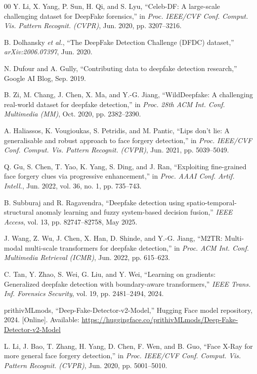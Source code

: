\documentclass[conference]{IEEEtran}
\begin{document}
\begin{thebibliography}{00}
 Y. Li, X. Yang, P. Sun, H. Qi, and S. Lyu, ``Celeb-DF: A large-scale challenging dataset for DeepFake forensics,'' in \textit{Proc. IEEE/CVF Conf. Comput. Vis. Pattern Recognit. (CVPR)}, Jun. 2020, pp. 3207--3216.

 B. Dolhansky \textit{et al.}, ``The DeepFake Detection Challenge (DFDC) dataset,'' \textit{arXiv:2006.07397}, Jun. 2020.

 N. Dufour and A. Gully, ``Contributing data to deepfake detection research,'' Google AI Blog, Sep. 2019.

 B. Zi, M. Chang, J. Chen, X. Ma, and Y.-G. Jiang, ``WildDeepfake: A challenging real-world dataset for deepfake detection,'' in \textit{Proc. 28th ACM Int. Conf. Multimedia (MM)}, Oct. 2020, pp. 2382--2390.

 A. Haliassos, K. Vougioukas, S. Petridis, and M. Pantic, ``Lips don't lie: A generalisable and robust approach to face forgery detection,'' in \textit{Proc. IEEE/CVF Conf. Comput. Vis. Pattern Recognit. (CVPR)}, Jun. 2021, pp. 5039--5049.

 Q. Gu, S. Chen, T. Yao, K. Yang, S. Ding, and J. Ran, ``Exploiting fine-grained face forgery clues via progressive enhancement,'' in \textit{Proc. AAAI Conf. Artif. Intell.}, Jun. 2022, vol. 36, no. 1, pp. 735--743.

 B. Subburaj and R. Ragavendra, ``Deepfake detection using spatio-temporal-structural anomaly learning and fuzzy system-based decision fusion,'' \textit{IEEE Access}, vol. 13, pp. 82747--82758, May 2025.

 J. Wang, Z. Wu, J. Chen, X. Han, D. Shinde, and Y.-G. Jiang, ``M2TR: Multi-modal multi-scale transformers for deepfake detection,'' in \textit{Proc. ACM Int. Conf. Multimedia Retrieval (ICMR)}, Jun. 2022, pp. 615--623.

 C. Tan, Y. Zhao, S. Wei, G. Liu, and Y. Wei, ``Learning on gradients: Generalized deepfake detection with boundary-aware transformers,'' \textit{IEEE Trans. Inf. Forensics Security}, vol. 19, pp. 2481--2494, 2024.

 prithivMLmods, ``Deep-Fake-Detector-v2-Model,'' Hugging Face model repository, 2024. [Online]. Available: \url{https://huggingface.co/prithivMLmods/Deep-Fake-Detector-v2-Model}

 L. Li, J. Bao, T. Zhang, H. Yang, D. Chen, F. Wen, and B. Guo, ``Face X-Ray for more general face forgery detection,'' in \textit{Proc. IEEE/CVF Conf. Comput. Vis. Pattern Recognit. (CVPR)}, Jun. 2020, pp. 5001--5010.


\end{thebibliography}
\end{document}
